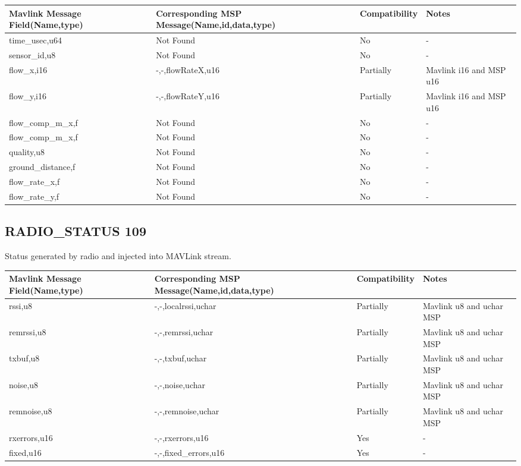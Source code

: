 {
\centering
\begin{tabular}{ |p{4cm  } |p{7cm} | p{2cm}|m{5em}|}
\hline
Mavlink Message Field(Name,type)&Corresponding MSP Message(Name,id,data,type)& Compatibility & Notes\\
\hline
time\_usec,u64 & Not Found & No & - \\
\hline
sensor\_id,u8 & Not Found & No & -\\
\hline
\rowcolor{lightgray}
flow\_x,i16 & -,-,flowRateX,u16 & Partially & Mavlink i16 and MSP u16 \\
\hline
\rowcolor{lightgray}
flow\_y,i16&  -,-,flowRateY,u16& Partially & Mavlink i16 and MSP u16 \\
\hline
flow\_comp\_m\_x,f & Not Found & No & -\\
\hline
flow\_comp\_m\_x,f  & Not Found & No & - \\
\hline
quality,u8 &Not Found& No & - \\
\hline
ground\_distance,f & Not Found & No & - \\
\hline
flow\_rate\_x,f & Not Found& No & - \\
\hline
flow\_rate\_y,f & Not Found& No & - \\



\end{tabular}
}

\cleardoublepage




\subsection{RADIO\_STATUS 109} 
Status generated by radio and injected into MAVLink stream.\\

{
\centering
\begin{tabular}{ |p{4cm  } |p{7cm} | p{2cm}|m{5em}|}
\hline
Mavlink Message Field(Name,type)&Corresponding MSP Message(Name,id,data,type)& Compatibility & Notes\\
\hline
\rowcolor{lightgray}
rssi,u8 & -,-,localrssi,uchar & Partially & Mavlink u8 and uchar MSP \\
\hline
\rowcolor{lightgray}
remrssi,u8 & -,-,remrssi,uchar & Partially & Mavlink u8 and uchar MSP \\
\hline
\rowcolor{lightgray}
txbuf,u8 & -,-,txbuf,uchar & Partially & Mavlink u8 and uchar MSP \\
\hline
\rowcolor{lightgray}
noise,u8& -,-,noise,uchar& Partially & Mavlink u8 and uchar MSP \\
\hline
\rowcolor{lightgray}
remnoise,u8 & -,-,remnoise,uchar& Partially & Mavlink u8 and uchar MSP \\
\hline
\rowcolor{green}
rxerrors,u16 & -,-,rxerrors,u16 & Yes & - \\
\hline
\rowcolor{green}
fixed,u16 & -,-,fixed\_errors,u16& Yes & - \\
\end{tabular}
}


